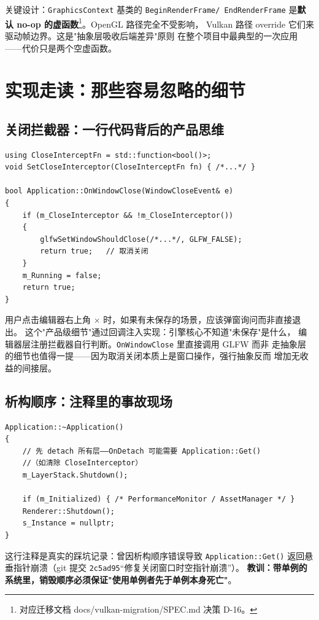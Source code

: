 关键设计：\texttt{GraphicsContext} 基类的 \texttt{BeginRenderFrame/
EndRenderFrame} 是\textbf{默认 no-op 的虚函数}\footnote{对应迁移文档
docs/vulkan-migration/SPEC.md 决策 D-16。}。OpenGL 路径完全不受影响，
Vulkan 路径 override 它们来驱动帧边界。这是"抽象层吸收后端差异"原则
在整个项目中最典型的一次应用——代价只是两个空虚函数。

\section{实现走读：那些容易忽略的细节}

\subsection{关闭拦截器：一行代码背后的产品思维}

\begin{lstlisting}
using CloseInterceptFn = std::function<bool()>;
void SetCloseInterceptor(CloseInterceptFn fn) { /*...*/ }

bool Application::OnWindowClose(WindowCloseEvent& e)
{
    if (m_CloseInterceptor && !m_CloseInterceptor())
    {
        glfwSetWindowShouldClose(/*...*/, GLFW_FALSE);
        return true;   // 取消关闭
    }
    m_Running = false;
    return true;
}
\end{lstlisting}

用户点击编辑器右上角 × 时，如果有未保存的场景，应该弹窗询问而非直接退出。
这个"产品级细节"通过回调注入实现：引擎核心不知道"未保存"是什么，
编辑器层注册拦截器自行判断。\texttt{OnWindowClose} 里直接调用 GLFW 而非
走抽象层的细节也值得一提——因为取消关闭本质上是窗口操作，强行抽象反而
增加无收益的间接层。

\subsection{析构顺序：注释里的事故现场}

\begin{lstlisting}
Application::~Application()
{
    // 先 detach 所有层——OnDetach 可能需要 Application::Get()
    //（如清除 CloseInterceptor）
    m_LayerStack.Shutdown();

    if (m_Initialized) { /* PerformanceMonitor / AssetManager */ }
    Renderer::Shutdown();
    s_Instance = nullptr;
}
\end{lstlisting}

这行注释是真实的踩坑记录：曾因析构顺序错误导致 \texttt{Application::Get()}
返回悬垂指针崩溃（git 提交 \texttt{2c5ad95}``修复关闭窗口时空指针崩溃''）。
\textbf{教训：带单例的系统里，销毁顺序必须保证"使用单例者先于单例本身死亡"}。

